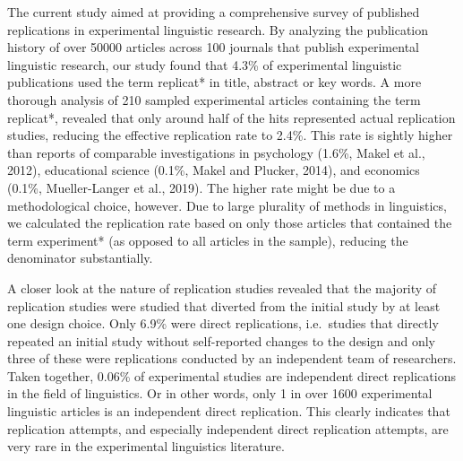 \documentclass[]{elsarticle} %
\begin{document}
The current study aimed at providing a comprehensive survey of published replications in experimental linguistic research.
By analyzing the publication history of over 50000 articles across 100 journals that publish experimental linguistic research, our study found that 4.3\% of experimental linguistic publications used the term replicat* in title, abstract or key words.
A more thorough analysis of 210 sampled experimental articles containing the term replicat*, revealed that only around half of the hits represented actual replication studies, reducing the effective replication rate to 2.4\%. This rate is sightly higher than reports of comparable investigations in psychology (1.6\%, Makel et al., 2012), educational science (0.1\%, Makel and Plucker, 2014), and economics (0.1\%, Mueller-Langer et al., 2019). The higher rate might be due to a methodological choice, however. Due to large plurality of methods in linguistics, we calculated the replication rate based on only those articles that contained the term experiment* (as opposed to all articles in the sample), reducing the denominator substantially.

A closer look at the nature of replication studies revealed that the majority of replication studies were studied that diverted from the initial study by at least one design choice. Only 6.9\% were direct replications, i.e.~studies that directly repeated an initial study without self-reported changes to the design and only three of these were replications conducted by an independent team of researchers.
Taken together, 0.06\% of experimental studies are independent direct replications in the field of linguistics. Or in other words, only 1 in over 1600 experimental linguistic articles is an independent direct replication. This clearly indicates that replication attempts, and especially independent direct replication attempts, are very rare in the experimental linguistics literature.
\end{document}
